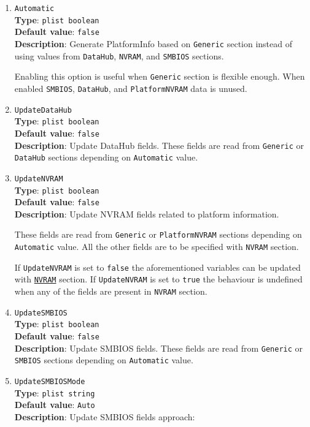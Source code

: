 \documentclass[]{article}
\begin{document}
\begin{enumerate}
\item
  \texttt{Automatic}\\
  \textbf{Type}: \texttt{plist\ boolean}\\
  \textbf{Default value}: \texttt{false}\\
  \textbf{Description}: Generate PlatformInfo based on \texttt{Generic}
  section instead of using values from \texttt{DataHub}, \texttt{NVRAM},
  and \texttt{SMBIOS} sections.

  Enabling this option is useful when \texttt{Generic} section is flexible
  enough. When enabled \texttt{SMBIOS}, \texttt{DataHub}, and
  \texttt{PlatformNVRAM} data is unused.
\item
  \texttt{UpdateDataHub}\\
  \textbf{Type}: \texttt{plist\ boolean}\\
  \textbf{Default value}: \texttt{false}\\
  \textbf{Description}: Update DataHub fields. These fields are read
  from \texttt{Generic} or \texttt{DataHub} sections depending on
  \texttt{Automatic} value.
\item
  \texttt{UpdateNVRAM}\\
  \textbf{Type}: \texttt{plist\ boolean}\\
  \textbf{Default value}: \texttt{false}\\
  \textbf{Description}: Update NVRAM fields related to platform information.

  These fields are read from \texttt{Generic} or \texttt{PlatformNVRAM} sections
  depending on \texttt{Automatic} value. All the other fields are
  to be specified with \texttt{NVRAM} section.

  If \texttt{UpdateNVRAM} is set to \texttt{false} the aforementioned
  variables can be updated with \hyperref[nvram]{\texttt{NVRAM}}
  section. If \texttt{UpdateNVRAM} is set to \texttt{true} the behaviour is
  undefined when any of the fields are present in \texttt{NVRAM} section.
\item
  \texttt{UpdateSMBIOS}\\
  \textbf{Type}: \texttt{plist\ boolean}\\
  \textbf{Default value}: \texttt{false}\\
  \textbf{Description}: Update SMBIOS fields. These fields are read from
  \texttt{Generic} or \texttt{SMBIOS} sections depending on
  \texttt{Automatic} value.
\item
  \texttt{UpdateSMBIOSMode}\\
  \textbf{Type}: \texttt{plist\ string}\\
  \textbf{Default value}: \texttt{Auto}\\
  \textbf{Description}: Update SMBIOS fields approach:


\end{enumerate}
\end{document}
